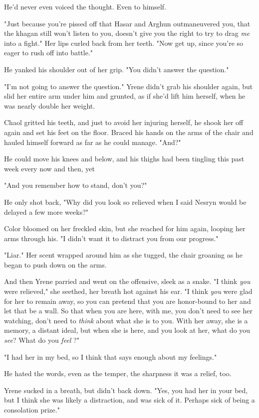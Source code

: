 He'd never even voiced the thought. Even to himself.

"Just because you're pissed off that Hasar and Arghun outmaneuvered you, that the khagan still won't listen to you, doesn't give you the right to try to drag \emph{me} into a fight." Her lips curled back from her teeth. "Now get up, since you're so eager to rush off into battle."

He yanked his shoulder out of her grip. "You didn't answer the question."

"I'm not going to answer the question." Yrene didn't grab his shoulder again, but slid her entire arm under him and grunted, as if she'd lift him herself, when he was nearly double her weight.

Chaol gritted his teeth, and just to avoid her injuring herself, he shook her off again and set his feet on the floor. Braced his hands on the arms of the chair and hauled himself forward as far as he could manage. "And?"

He could move his knees and below, and his thighs had been tingling this past week every now and then, yet 

"And you remember how to stand, don't you?"

He only shot back, "Why did you look so relieved when I said Nesryn would be delayed a few more weeks?"

Color bloomed on her freckled skin, but she reached for him again, looping her arms through his. "I didn't want it to distract you from our progress."

"Liar." Her scent wrapped around him as she tugged, the chair groaning as he began to push down on the arms.

And then Yrene parried and went on the offensive, sleek as a snake. "I think \emph{you} were relieved," she seethed, her breath hot against his ear. "I think \emph{you} were glad for her to remain away, so you can pretend that you are honor-bound to her and let that be a wall. So that when you are here, with me, you don't need to see her watching, don't need to \emph{think} about what she is to you. With her away, she is a memory, a distant ideal, but when she is here, and you look at her, what do you \emph{see}? What do you \emph{feel} ?"

"I had her in my bed, so I think that says enough about my feelings."

He hated the words, even as the temper, the sharpness  it was a relief, too.

Yrene sucked in a breath, but didn't back down. "Yes, you had her in your bed, but I think she was likely a distraction, and was sick of it. Perhaps sick of being a consolation prize."

